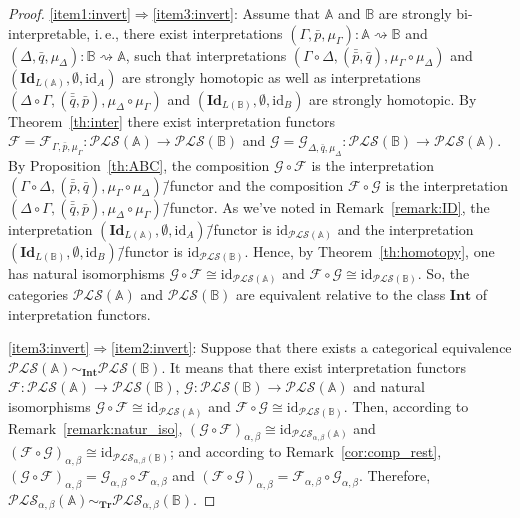 \documentclass[12pt]{article}
\theoremstyle{definition}
\def\MA{{\mathbb{A}}}
\def\MB{{\mathbb{B}}}
\def\F{{\mathcal{F}}}
\def\G{{\mathcal{G}}}
\def\Int{{\mathbf{Int}}}
\def\Tr{{\mathbf{Tr}}}
\def\PLS{{\mathcal{PLS}}}
\def\id{{\mathrm{id}}}
\def\Id{{\mathbf{Id}}}
\begin{document}
\begin{proof}
\ref{item1:invert}$\Longrightarrow$\ref{item3:invert}: Assume that $\MA$ and $\MB$ are strongly bi-interpretable, i.\,e., there exist interpretations $(\Gamma,\bar p,\mu_\Gamma)\colon \MA\rightsquigarrow\MB$ and $(\Delta,\bar q,\mu_\Delta)\colon \MB\rightsquigarrow\MA$, such that interpretations $(\Gamma\circ\Delta,(\bar{\bar p},\bar q),\mu_\Gamma\circ\mu_\Delta)$ and $(\Id_{L(\MA)},\emptyset,\id_A)$ are strongly homotopic as well as interpretations $(\Delta\circ\Gamma,(\bar{\bar q},\bar p),\mu_\Delta\circ\mu_\Gamma)$ and $(\Id_{L(\MB)},\emptyset,\id_B)$ are strongly homotopic. By Theorem~\ref{th:inter} there exist interpretation functors $\F=\F_{\Gamma,\bar p,\mu_\Gamma}\colon \PLS(\MA)\to \PLS(\MB)$ and $\G=\G_{\Delta,\bar q,\mu_\Delta}\colon \PLS(\MB)\to \PLS(\MA)$. By Proposition~\ref{th:ABC}, the composition $\G\circ\F$ is the interpretation $(\Gamma\circ\Delta,(\bar{\bar p},\bar q),\mu_\Gamma\circ\mu_\Delta)$\=/functor and the composition $\F\circ\G$ is the interpretation $(\Delta\circ\Gamma,(\bar{\bar q},\bar p),\mu_\Delta\circ\mu_\Gamma)$\=/functor. As we've  noted in Remark~\ref{remark:ID}, the interpretation $(\Id_{L(\MA)},\emptyset,\id_A)$\=/functor is $\id_{\PLS(\MA)}$ and the interpretation $(\Id_{L(\MB)},\emptyset,\id_B)$\=/functor is $\id_{\PLS(\MB)}$. Hence, by Theorem~\ref{th:homotopy}, one has natural isomorphisms $\G\circ\F\cong\id_{\PLS(\MA)}$ and $\F\circ\G\cong\id_{\PLS(\MB)}$. So, the categories $\PLS(\MA)$ and $\PLS(\MB)$ are equivalent relative to the class $\Int$ of interpretation functors. 

\ref{item3:invert}$\Longrightarrow$\ref{item2:invert}: Suppose that there exists a categorical equivalence $\PLS(\MA)\sim_\Int\PLS(\MB)$. It means that there exist interpretation functors $\F\colon \PLS(\MA)\to \PLS(\MB)$, $\G\colon \PLS(\MB)\to\PLS(\MA)$ and natural isomorphisms $\G\circ\F\cong\id_{\PLS(\MA)}$ and $\F\circ\G\cong\id_{\PLS(\MB)}$. Then, according to Remark~\ref{remark:natur_iso}, $(\G\circ\F)_{\alpha,\beta}\cong\id_{\PLS_{\alpha,\beta}(\MA)}$ and $(\F\circ\G)_{\alpha,\beta}\cong\id_{\PLS_{\alpha,\beta}(\MB)}$; and according to Remark~\ref{cor:comp_rest}, $(\G\circ\F)_{\alpha,\beta}=\G_{\alpha,\beta}\circ\F_{\alpha,\beta}$ and $(\F\circ\G)_{\alpha,\beta}=\F_{\alpha,\beta}\circ\G_{\alpha,\beta}$. Therefore, $\PLS_{\alpha,\beta}(\MA)\sim_\Tr\PLS_{\alpha,\beta}(\MB)$.


\end{proof}
\end{document}
